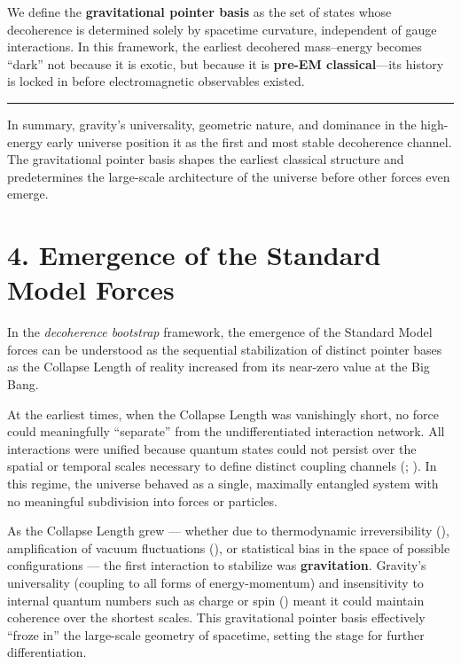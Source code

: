 \documentclass[
]{article}
\begin{document}
We define the \textbf{gravitational pointer basis} as the set of states
whose decoherence is determined solely by spacetime curvature,
independent of gauge interactions. In this framework, the earliest
decohered mass--energy becomes ``dark'' not because it is exotic, but
because it is \textbf{pre-EM classical}---its history is locked in
before electromagnetic observables existed.

\begin{center}\rule{0.5\linewidth}{0.5pt}\end{center}

In summary, gravity's universality, geometric nature, and dominance in
the high-energy early universe position it as the first and most stable
decoherence channel. The gravitational pointer basis shapes the earliest
classical structure and predetermines the large-scale architecture of
the universe before other forces even emerge.

\section{4. Emergence of the Standard Model
Forces}\label{emergence-of-the-standard-model-forces}

In the \emph{decoherence bootstrap} framework, the emergence of the
Standard Model forces can be understood as the sequential stabilization
of distinct pointer bases as the Collapse Length of reality increased
from its near-zero value at the Big Bang.

At the earliest times, when the Collapse Length was vanishingly short,
no force could meaningfully ``separate'' from the undifferentiated
interaction network. All interactions were unified because quantum
states could not persist over the spatial or temporal scales necessary
to define distinct coupling channels
(;
). In this regime, the universe
behaved as a single, maximally entangled system with no meaningful
subdivision into forces or particles.

As the Collapse Length grew --- whether due to thermodynamic
irreversibility (), amplification of vacuum fluctuations
(), or
statistical bias in the space of possible configurations --- the first
interaction to stabilize was \textbf{gravitation}. Gravity's
universality (coupling to all forms of energy-momentum) and
insensitivity to internal quantum numbers such as charge or spin
() meant it
could maintain coherence over the shortest scales. This gravitational
pointer basis effectively ``froze in'' the large-scale geometry of
spacetime, setting the stage for further differentiation.
\end{document}
